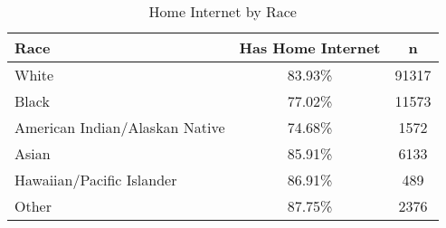 \documentclass{article}
\begin{document}
\begin{table}[ht]
\centering
\begin{tabular}{lcc}
  \hline
  Race & Has Home Internet & n \\ 
  \hline
  White & 83.93\% & 91317 \\ 
  Black & 77.02\% & 11573 \\ 
  American Indian/Alaskan Native & 74.68\% & 1572 \\ 
  Asian & 85.91\% & 6133 \\ 
  Hawaiian/Pacific Islander & 86.91\% & 489 \\ 
  Other & 87.75\% & 2376 \\ 
   \hline
\end{tabular}
\caption*{Home Internet by Race} 
\end{table}
\end{document}
